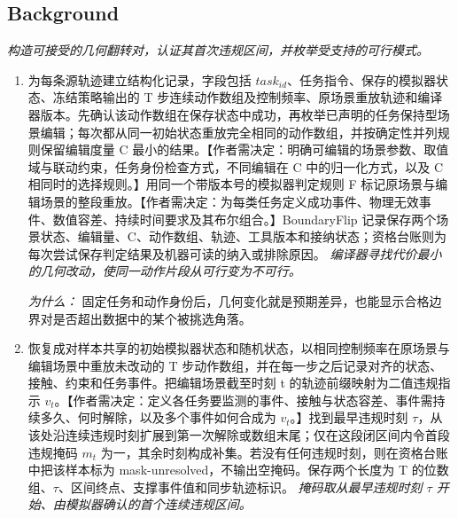 \documentclass[10pt,a4paper]{article}
\begin{document}
\subsection*{Background}
\emph{构造可接受的几何翻转对，认证其首次违规区间，并枚举受支持的可行模式。}
\begin{enumerate}[leftmargin=*,start=1]
  \item 为每条源轨迹建立结构化记录，字段包括 \(task_{id}\)、任务指令、保存的模拟器状态、冻结策略输出的 T 步连续动作数组及控制频率、原场景重放轨迹和编译器版本。先确认该动作数组在保存状态中成功，再枚举已声明的任务保持型场景编辑；每次都从同一初始状态重放完全相同的动作数组，并按确定性并列规则保留编辑度量 C 最小的结果。【作者需决定：明确可编辑的场景参数、取值域与联动约束，任务身份检查方式，不同编辑在 C 中的归一化方式，以及 C 相同时的选择规则。】用同一个带版本号的模拟器判定规则 F 标记原场景与编辑场景的整段重放。【作者需决定：为每类任务定义成功事件、物理无效事件、数值容差、持续时间要求及其布尔组合。】BoundaryFlip 记录保存两个场景状态、编辑量、C、动作数组、轨迹、工具版本和接纳状态；资格台账则为每次尝试保存判定结果及机器可读的纳入或排除原因。
\noindent\emph{编译器寻找代价最小的几何改动，使同一动作片段从可行变为不可行。}
\par{}
\par\emph{为什么：} 固定任务和动作身份后，几何变化就是预期差异，也能显示合格边界对是否超出数据中的某个被挑选角落。
  \item 恢复成对样本共享的初始模拟器状态和随机状态，以相同控制频率在原场景与编辑场景中重放未改动的 T 步动作数组，并在每一步之后记录对齐的状态、接触、约束和任务事件。把编辑场景截至时刻 t 的轨迹前缀映射为二值违规指示 \(v_{t}\)。【作者需决定：定义各任务要监测的事件、接触与状态容差、事件需持续多久、何时解除，以及多个事件如何合成为 \(v_{t}\)。】找到最早违规时刻 \(\tau \)，从该处沿连续违规时刻扩展到第一次解除或数组末尾；仅在这段闭区间内令首段违规掩码 \(m_{t}\) 为一，其余时刻构成补集。若没有任何违规时刻，则在资格台账中把该样本标为 mask-unresolved，不输出空掩码。保存两个长度为 T 的位数组、\(\tau \)、区间终点、支撑事件值和同步轨迹标识。
\noindent\emph{掩码取从最早违规时刻 \(\tau \) 开始、由模拟器确认的首个连续违规区间。}
\par{}

\end{enumerate}
\end{document}
